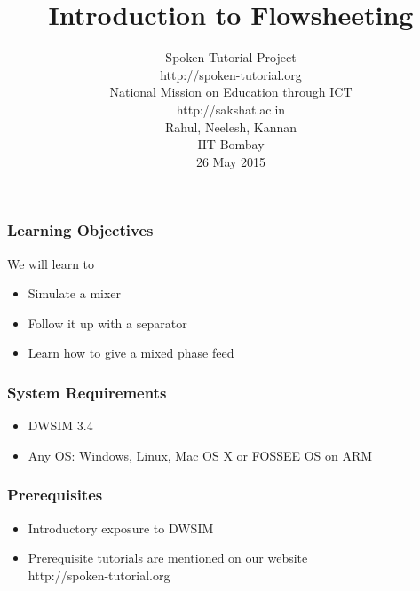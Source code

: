 \documentclass[17pt,xcolor=table]{beamer}
\begin{document}
\sffamily \bfseries
\title
[Introduction to Flowsheeting]
{Introduction to Flowsheeting}
\author [Rahul, Neelesh, Kannan]
{\small Spoken Tutorial Project \\
http://spoken-tutorial.org \\ [0.3cm]
  National Mission
  on Education 
  through ICT \\ 
  http://sakshat.ac.in \\ [0.3cm]
  Rahul, Neelesh, Kannan \\ IIT Bombay \\ [0.35cm]
\small 26 May 2015}
\date{}
\begin{frame}
   \titlepage
\end{frame}

\begin{frame}
\frametitle{Learning Objectives}
\vspace{-0.25in}
We will learn to 
\begin{itemize}
\item Simulate a mixer
\item Follow it up with a separator
\item Learn how to give a mixed phase feed
\end{itemize}
\end{frame}

\begin{frame}
\frametitle{System Requirements}
\begin{itemize}
\item DWSIM 3.4
\item Any OS: Windows, Linux, Mac OS X or FOSSEE OS on ARM
\end{itemize}
\end{frame}

\begin{frame}
  \frametitle{Prerequisites}
  \begin{itemize}
  \item Introductory exposure to DWSIM
  \item Prerequisite tutorials are mentioned on our website \\
    http://spoken-tutorial.org
  \end{itemize}
\end{frame}
\end{document}
